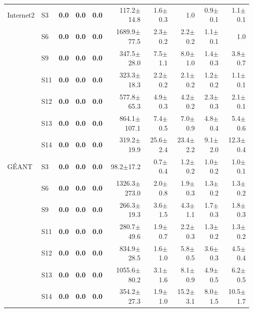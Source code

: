 \begin{table}[t]
\begin{tabular}{llrrrrrrrr}
\midrule
Internet2 & S3 & \textbf{0.0} & \textbf{0.0} & \textbf{0.0} & 117.2$\pm$14.8 & 1.6$\pm$0.3 & 1.0 & 0.9$\pm$0.1 & 1.1$\pm$0.1\\
 & S6 & \textbf{0.0} & \textbf{0.0} & \textbf{0.0} & 1689.9$\pm$77.5 & 2.3$\pm$0.2 & 2.2$\pm$0.2 & 1.1$\pm$0.1 & 1.0\\
 & S9 & \textbf{0.0} & \textbf{0.0} & \textbf{0.0} & 347.5$\pm$28.0 & 7.5$\pm$1.1 & 8.0$\pm$1.0 & 1.4$\pm$0.3 & 3.8$\pm$0.7\\
 & S11 & \textbf{0.0} & \textbf{0.0} & \textbf{0.0} & 323.3$\pm$18.3 & 2.2$\pm$0.2 & 2.1$\pm$0.2 & 1.2$\pm$0.2 & 1.1$\pm$0.1\\
 & S12 & \textbf{0.0} & \textbf{0.0} & \textbf{0.0} & 577.8$\pm$65.3 & 4.9$\pm$0.3 & 4.2$\pm$0.2 & 2.3$\pm$0.3 & 2.1$\pm$0.1\\
 & S13 & \textbf{0.0} & \textbf{0.0} & \textbf{0.0} & 864.1$\pm$107.1 & 7.4$\pm$0.5 & 7.0$\pm$0.9 & 4.8$\pm$0.4 & 5.4$\pm$0.6\\
 & S14 & \textbf{0.0} & \textbf{0.0} & \textbf{0.0} & 319.2$\pm$19.9 & 25.6$\pm$2.4 & 23.4$\pm$2.2 & 9.1$\pm$2.0 & 12.3$\pm$0.4\\
\midrule
G\'EANT & S3 & \textbf{0.0} & \textbf{0.0} & \textbf{0.0} & 98.2$\pm$17.2 & 0.7$\pm$0.4 & 1.2$\pm$0.2 & 1.0$\pm$0.2 & 1.0$\pm$0.1\\
 & S6 & \textbf{0.0} & \textbf{0.0} & \textbf{0.0} & 1326.3$\pm$273.0 & 2.0$\pm$0.8 & 1.9$\pm$0.3 & 1.3$\pm$0.2 & 1.3$\pm$0.2\\
 & S9 & \textbf{0.0} & \textbf{0.0} & \textbf{0.0} & 266.3$\pm$19.3 & 3.6$\pm$1.5 & 4.3$\pm$1.1 & 1.7$\pm$0.3 & 1.8$\pm$0.3\\
 & S11 & \textbf{0.0} & \textbf{0.0} & \textbf{0.0} & 280.7$\pm$49.6 & 1.9$\pm$0.7 & 2.2$\pm$0.3 & 1.3$\pm$0.2 & 1.3$\pm$0.2\\
 & S12 & \textbf{0.0} & \textbf{0.0} & \textbf{0.0} & 834.9$\pm$28.5 & 1.6$\pm$1.0 & 5.8$\pm$0.5 & 3.6$\pm$0.3 & 4.5$\pm$0.4\\
 & S13 & \textbf{0.0} & \textbf{0.0} & \textbf{0.0} & 1055.6$\pm$80.2 & 3.1$\pm$1.6 & 8.1$\pm$0.9 & 4.9$\pm$0.5 & 6.2$\pm$0.5\\
 & S14 & \textbf{0.0} & \textbf{0.0} & \textbf{0.0} & 354.2$\pm$27.3 & 1.9$\pm$1.0 & 15.2$\pm$3.1 & 8.0$\pm$1.5 & 10.5$\pm$1.7\\
\bottomrule
\end{tabular}
\end{table}